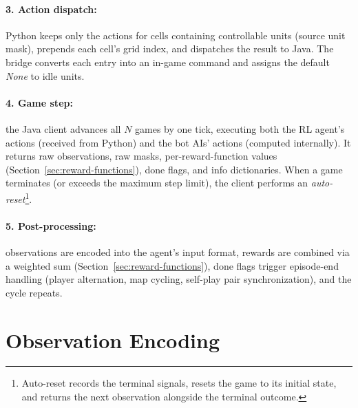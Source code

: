 \paragraph*{3. Action dispatch:} Python keeps only the actions for cells containing controllable units (source unit mask), prepends each cell's grid index, and dispatches the result to Java. The bridge converts each entry into an in-game command and assigns the default \emph{None} to idle units.

\paragraph*{4. Game step:} the Java client advances all $N$ games by one tick, executing both the RL agent's actions (received from Python) and the bot AIs' actions (computed internally). It returns raw observations, raw masks, per-reward-function values (Section~\ref{sec:reward-functions}), done flags, and info dictionaries. When a game terminates (or exceeds the maximum step limit), the client performs an \emph{auto-reset}\footnote{Auto-reset records the terminal signals, resets the game to its initial state, and returns the next observation alongside the terminal outcome.}.

\paragraph*{5. Post-processing:} observations are encoded into the agent's input format, rewards are combined via a weighted sum (Section~\ref{sec:reward-functions}), done flags trigger episode-end handling (player alternation, map cycling, self-play pair synchronization), and the cycle repeats.

\section{Observation Encoding}
\label{sec:obs-encoding}

